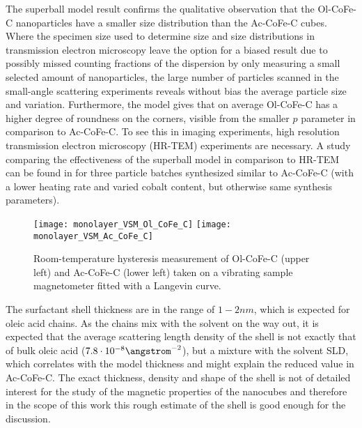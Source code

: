 \documentclass[\main/dresen_thesis.tex]{subfiles}
\begin{document}
    The superball model result confirms the qualitative observation that the Ol-CoFe-C nanoparticles have a smaller size distribution than the Ac-CoFe-C cubes.
    Where the specimen size used to determine size and size distributions in transmission electron microscopy leave the option for a biased result due to possibly missed counting fractions of the dispersion by only measuring a small selected amount of nanoparticles, the large number of particles scanned in the small-angle scattering experiments reveals without bias the average particle size and variation.
    Furthermore, the model gives that on average Ol-CoFe-C has a higher degree of roundness on the corners, visible from the smaller $p$ parameter in comparison to Ac-CoFe-C.
    To see this in imaging experiments, high resolution transmission electron microscopy (HR-TEM) experiments are necessary.
    A study comparing the effectiveness of the superball model in comparison to HR-TEM can be found in  for three particle batches synthesized similar to Ac-CoFe-C (with a lower heating rate and varied cobalt content, but otherwise same synthesis parameters).

    \begin{figure}[tb]
      \centering
      \texttt{[image: monolayer\_VSM\_Ol\_CoFe\_C]}
      \texttt{[image: monolayer\_VSM\_Ac\_CoFe\_C]}
      \caption{\label{fig:monolayers:nanoparticle:vsm}Room-temperature hysteresis measurement of Ol-CoFe-C (upper left) and Ac-CoFe-C (lower left) taken on a vibrating sample magnetometer fitted with a Langevin curve.}
    \end{figure}
    The surfactant shell thickness are in the range of $1 - 2 \unit{nm}$, which is expected for oleic acid chains.
    As the chains mix with the solvent on the way out, it is expected that the average scattering length density of the shell is not exactly that of bulk oleic acid ($7.8 \cdot 10^{-8} \angstrom^{-2}$), but a mixture with the solvent SLD, which correlates with the model thickness and might explain the reduced value in Ac-CoFe-C.
    The exact thickness, density and shape of the shell is not of detailed interest for the study of the magnetic properties of the nanocubes and therefore in the scope of this work this rough estimate of the shell is good enough for the discussion.
\end{document}
